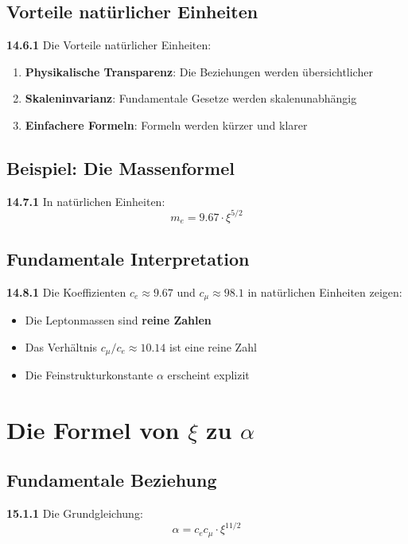 \subsection{Vorteile natürlicher Einheiten}

\noindent \textbf{14.6.1} Die Vorteile natürlicher Einheiten:
\begin{enumerate}
	\item \textbf{Physikalische Transparenz}: Die Beziehungen werden übersichtlicher
	\item \textbf{Skaleninvarianz}: Fundamentale Gesetze werden skalenunabhängig
	\item \textbf{Einfachere Formeln}: Formeln werden kürzer und klarer
\end{enumerate}

\subsection{Beispiel: Die Massenformel}

\noindent \textbf{14.7.1} In natürlichen Einheiten:
\[
m_e = 9.67 \cdot \xi^{5/2}
\]

\subsection{Fundamentale Interpretation}

\noindent \textbf{14.8.1} Die Koeffizienten $c_e \approx 9.67$ und $c_\mu \approx 98.1$ in natürlichen Einheiten zeigen:

\begin{itemize}
	\item Die Leptonmassen sind \textbf{reine Zahlen}
	\item Das Verhältnis $c_\mu/c_e \approx 10.14$ ist eine reine Zahl
	\item Die Feinstrukturkonstante $\alpha$ erscheint explizit
\end{itemize}

\section{Die Formel von $\xi$ zu $\alpha$}

\subsection{Fundamentale Beziehung}

\noindent \textbf{15.1.1} Die Grundgleichung:
\[
\boxed{\alpha = c_e c_\mu \cdot \xi^{11/2}}
\]

